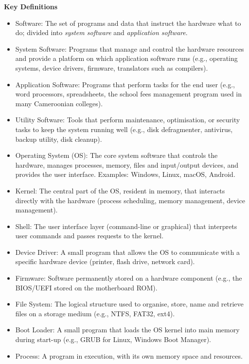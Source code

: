 \documentclass[11pt]{article}
\newcommand{\cle}[1]{{\popxbold\color{popdark}#1}}
\begin{document}
\begin{bilan}
\textbf{Key Definitions}
\begin{itemize}
\item \cle{Software}: The set of programs and data that instruct the hardware what to do; divided into \emph{system software} and \emph{application software}.
\item \cle{System Software}: Programs that manage and control the hardware resources and provide a platform on which application software runs (e.g., operating systems, device drivers, firmware, translators such as compilers).
\item \cle{Application Software}: Programs that perform tasks for the end user (e.g., word processors, spreadsheets, the school fees management program used in many Cameroonian colleges).
\item \cle{Utility Software}: Tools that perform maintenance, optimisation, or security tasks to keep the system running well (e.g., disk defragmenter, antivirus, backup utility, disk cleanup).
\item \cle{Operating System (OS)}: The core system software that controls the hardware, manages processes, memory, files and input/output devices, and provides the user interface. Examples: Windows, Linux, macOS, Android.
\item \cle{Kernel}: The central part of the OS, resident in memory, that interacts directly with the hardware (process scheduling, memory management, device management).
\item \cle{Shell}: The user interface layer (command-line or graphical) that interprets user commands and passes requests to the kernel.
\item \cle{Device Driver}: A small program that allows the OS to communicate with a specific hardware device (printer, flash drive, network card).
\item \cle{Firmware}: Software permanently stored on a hardware component (e.g., the BIOS/UEFI stored on the motherboard ROM).
\item \cle{File System}: The logical structure used to organise, store, name and retrieve files on a storage medium (e.g., NTFS, FAT32, ext4).
\item \cle{Boot Loader}: A small program that loads the OS kernel into main memory during start-up (e.g., GRUB for Linux, Windows Boot Manager).
\item \cle{Process}: A program in execution, with its own memory space and resources.
\end{itemize}


\end{bilan}
\end{document}
